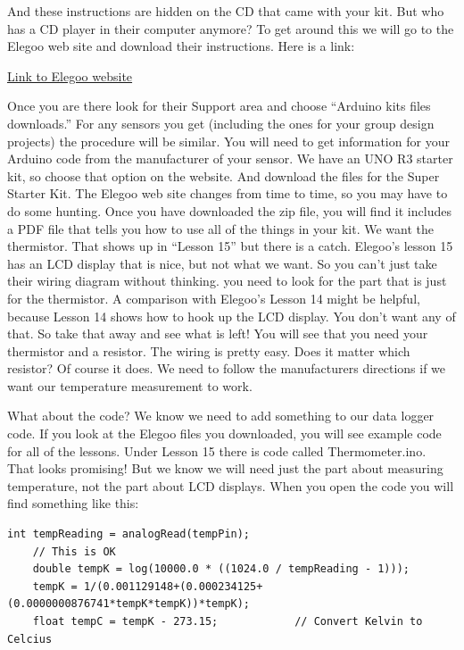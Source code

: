 And these instructions are hidden on the CD that came with your kit.  But who has a CD player in their computer anymore?  To get around this we will go to the Elegoo web site and download their instructions. Here is a link:

\begin{center}
 \href{https://www.elegoo.com/products/elegoo-uno-project-super-starter-kit}{Link to Elegoo website}
\end{center}

Once you are there look for their Support area and choose ``Arduino kits files downloads.'' For any sensors you get (including the ones for your group design projects) the procedure will be similar. You will need to get information for your Arduino code from the manufacturer of your sensor. We have an UNO R3 starter kit, so choose that option on the website.  And download the files for the Super Starter Kit.  The Elegoo web site changes from time to time, so you may have to do some hunting. Once you have downloaded the zip file, you will find it includes a PDF file that tells you how to use all of the things in your kit. We want the thermistor. That shows up in ``Lesson 15'' but there is a catch.  Elegoo's lesson 15 has an LCD display that is nice, but not what we want. So you can't just take their wiring diagram without thinking. you need to look for the part that is just for the thermistor.  A comparison with Elegoo's Lesson 14 might be helpful, because Lesson 14 shows how to hook up the LCD display.  You don't want any of that.  So take that away and see what is left!  You will see that you need your thermistor and a resistor. The wiring is pretty easy.  Does it matter which resistor?  Of course it does. We need to follow the manufacturers directions if we want our temperature measurement to work.  

What about the code?  We know we need to add something to our data logger code.  If you look at the Elegoo files you downloaded, you will see example code for all of the lessons.  Under Lesson 15 there is code called Thermometer.ino.  That looks promising!  But we know we will need just the part about measuring temperature, not the part about LCD displays.  When you open the code you will find something like this:


\begin{scriptsize}
\begin{lstlisting}[language=Arduino]
	int tempReading = analogRead(tempPin);
	// This is OK
	double tempK = log(10000.0 * ((1024.0 / tempReading - 1)));
	tempK = 1/(0.001129148+(0.000234125+(0.0000000876741*tempK*tempK))*tempK);
	float tempC = tempK - 273.15;            // Convert Kelvin to Celcius
\end{lstlisting}
\end{scriptsize}

